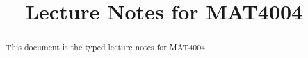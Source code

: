 \documentclass[examplefnt,biber]{nowfnt} %
\title{Lecture Notes for MAT4004}
\begin{document}
\makeabstracttitle
\begin{abstract}
This document is the typed lecture notes for MAT4004

\end{abstract}







%
%
%
%
%
%
%
\end{document}
